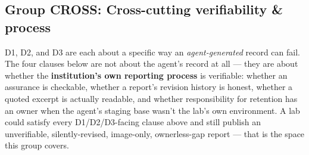 \subsection*{Group CROSS: Cross-cutting verifiability \& process}
D1, D2, and D3 are each about a specific way an \emph{agent-generated} record can fail. The four clauses below are not about the agent's record at all --- they are about whether the \textbf{institution's own reporting process} is verifiable: whether an assurance is checkable, whether a report's revision history is honest, whether a quoted excerpt is actually readable, and whether responsibility for retention has an owner when the agent's staging base wasn't the lab's own environment. A lab could satisfy every D1/D2/D3-facing clause above and still publish an unverifiable, silently-revised, image-only, ownerless-gap report --- that is the space this group covers.

